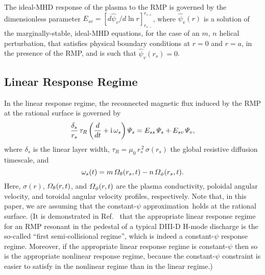 \documentclass[12pt,prb,aps]{revtex4-1}
\begin{document}
The ideal-MHD response of the plasma to the RMP is governed by the dimensionless parameter
$E_{sv}= [d\hat{\psi}_v/d\ln r]_{r_{s-}}^{r_{s+}}$, where $\hat{\psi}_v(r)$
is a solution of the marginally-stable, ideal-MHD equations, for the case of an $m$, $n$ helical
perturbation, that satisfies physical boundary conditions at $r=0$ and $r=a$, in the presence of the
RMP, and is such that $\hat{\psi}_v(r_s)=0$.\cite{am1} 

\subsection{Linear Response Regime}
In the linear response regime, the reconnected magnetic flux induced by the RMP at the
rational surface is governed by\,\cite{rfa,rfb,rfc}
\begin{equation}\label{e1}
\frac{\delta_s}{r_s}\,\tau_R\left(\frac{d}{dt}+{\rm i}\,\omega_s\right){\mit\Psi}_s= E_{ss}\,{\mit\Psi}_s+E_{sv}\,{\mit\Psi}_v,
\end{equation}
where $\delta_s$ is the linear layer width, $\tau_R=\mu_0\,r_s^{\,2}\,\sigma(r_s)$ the global resistive diffusion timescale,
 and
\begin{equation}
\omega_s (t)=m\,{\mit\Omega}_\theta(r_s,t)-n\,{\mit\Omega}_\phi(r_s,t).
\end{equation}
Here, $\sigma(r)$, ${\mit\Omega}_\theta(r,t)$, and ${\mit\Omega}_\phi(r,t)$ are the 
plasma conductivity, poloidal angular velocity, and toroidal angular velocity profiles, respectively. 
Note that, in this paper, we are assuming that the constant-$\psi$ approximation\,\cite{fkr} holds at the rational surface. (It is demonstrated in
Ref.~ that the appropriate linear response regime for an RMP resonant in the pedestal of a typical DIII-D H-mode discharge
is the so-called  ``first semi-collisional regime'', which is indeed a constant-$\psi$ response regime. Moreover, if the appropriate linear response regime
is constant-$\psi$ then so is the appropriate nonlinear response regime, because the constant-$\psi$ constraint is
easier to satisfy in the nonlinear regime than in the linear regime.\cite{rfb,rffig})
\end{document}
